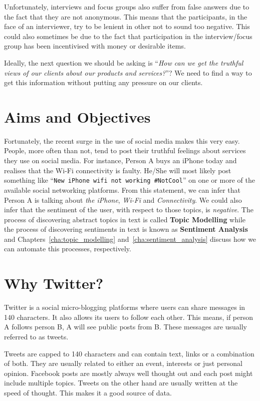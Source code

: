 Unfortunately, interviews and focus groups also suffer from false answers due to the fact that they
are not anonymous. This means that the participants, in the face of an interviewer, try to be
lenient in other not to sound too negative. This could also sometimes be due to the fact that
participation in the interview/focus group has been incentivised with money or desirable items.

Ideally, the next question we should be asking is ``\textit{How can we get the truthful views of our
clients about our products and services?}''? We need to find a way to get this information without
putting any pressure on our clients.

\section{Aims and Objectives}
\label{sec:objectives}
Fortunately, the recent surge in the use of social media makes this very easy. People, more often
than not, tend to post their truthful feelings about services they use on social media. For
instance, Person A buys an iPhone today and realises that the Wi-Fi connectivity is faulty. He/She
will most likely post something like ``\texttt{New iPhone wifi not working \#NotCool}'' on one or
more of the available social networking platforms. From this statement, we can infer that Person A
is talking about \textit{the iPhone}, \textit{Wi-Fi} and \textit{Connectivity}. We could also infer
that the sentiment of the user, with respect to those topics, is \textit{negative}. The process of
discovering abstract topics in text is called \textbf{Topic Modelling} while the process of
discovering sentiments in text is known as \textbf{Sentiment Analysis} and
Chapters~\ref{cha:topic_modelling} and~\ref{cha:sentiment_analysis} discuss how we can automate this
processes, respectively.

\section{Why Twitter?}
Twitter is a social micro-blogging platforms where users can share messages in 140 characters. It
also allows its users to follow each other. This means, if person A follows person B, A will see
public posts from B. These messages are usually referred to as tweets.

Tweets are capped to 140 characters and can contain text, links or a combination of both. They are
usually related to either an event, interests or just personal opinion. Facebook posts are mostly
always well thought out and each post might include multiple topics. Tweets on the other hand are
usually written at the speed of thought. This makes it a good source of data.

